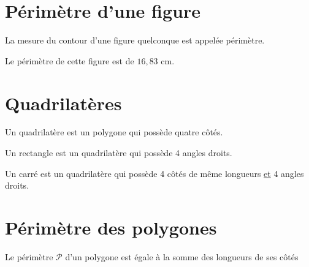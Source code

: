 \documentclass[11pt]{article}
\begin{document}
\section{Périmètre d'une figure}

\begin{vocabulaire}
La mesure du contour d'une figure quelconque est appelée périmètre.
\end{vocabulaire}

\begin{center}
\end{center}

Le périmètre de cette figure est de $16,83$ cm. 

\begin{center}
\end{center}

\section{Quadrilatères}
\begin{definition}
Un quadrilatère est un polygone qui possède quatre côtés.
\end{definition}

\begin{multicols}{2}

\begin{definition}
Un rectangle est un quadrilatère qui possède 4 angles droits.
\end{definition}

\begin{center}

\end{center}

\begin{definition}
Un carré est un quadrilatère qui possède 4 côtés de même longueurs
\underline{et} 4 angles droits.
\end{definition}

\begin{center}

\end{center}

\end{multicols}

\section{Périmètre des polygones}


\begin{definition}
Le périmètre $\mathcal{P}$ d'un polygone est égale à la somme des
longueurs de ses côtés
\end{definition}
\end{document}
